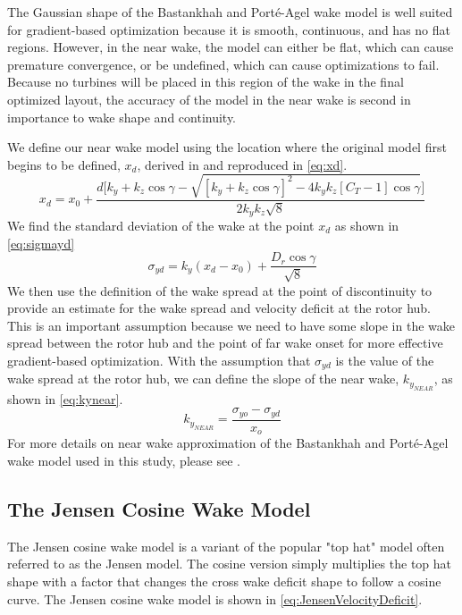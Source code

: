 \documentclass[a4paper]{jpconf}
\begin{document}
The Gaussian shape of the Bastankhah and Port\'e-Agel wake model is well suited for gradient-based optimization because it is smooth, continuous, and has no flat regions. However, in the near wake, the model can either be flat, which can cause premature convergence, or be undefined, which can cause optimizations to fail. Because no turbines will be placed in this region of the wake in the final optimized layout, the accuracy of the model in the near wake is second in importance to wake shape and continuity. 

We define our near wake model using the location where the original model first begins to be defined, $x_d$, derived in \cite{thomas2019-les-validation} and reproduced in \cref{eq:xd}.
%
\begin{equation}\label{eq:xd}
x_d = x_0 + \frac{d\Bigg[k_y+k_z\cos{\gamma} - \sqrt{[k_y+k_z\cos{\gamma}]^2-4k_y k_z[C_T-1]\cos{\gamma}}\Bigg]}{2k_y k_z\sqrt{8}}
\end{equation}
%
We find the standard deviation of the wake at the point $x_d$ as shown in \cref{eq:sigmayd}
%
\begin{equation}\label{eq:sigmayd}
\sigma_{yd} = k_y (x_d - x_0) + \frac{D_r \cos{\gamma}}{\sqrt{8}}
\end{equation}
%
We then use the definition of the wake spread at the point of discontinuity to provide an estimate for the wake spread and velocity deficit at the rotor hub. This is an important assumption because we need to have some slope in the wake spread between the rotor hub and the point of far wake onset for more effective gradient-based optimization. With the assumption that $\sigma_{yd}$ is the value of the wake spread at the rotor hub, we can define the slope of the near wake, $k_{y_{NEAR}}$, as shown in \cref{eq:kynear}.
%
\begin{equation}\label{eq:kynear}
k_{y_{NEAR}} = \frac{\sigma_{yo}-\sigma_{yd}}{x_o}
\end{equation}
For more details on near wake approximation of the Bastankhah and Port\'e-Agel wake model used in this study, please see \cite{thomas2019-les-validation}.

\subsection{The Jensen Cosine Wake Model}
The Jensen cosine wake model is a variant of the popular "top hat" model often referred to as the Jensen model. The cosine version simply multiplies the top hat shape with a factor that changes the cross wake deficit shape to follow a cosine curve. The Jensen cosine wake model is shown in \cref{eq:JensenVelocityDeficit}.
\end{document}
